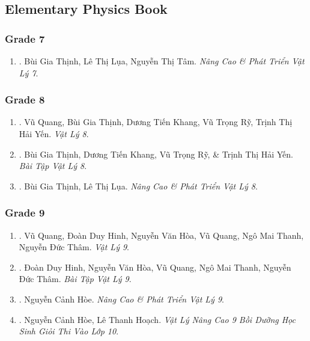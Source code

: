 \documentclass{article}
\begin{document}
\subsection{Elementary Physics Book}

\subsubsection{Grade 7}

\begin{enumerate}
	\item \cite{Thinh_Lua_ncpt_Vat_Ly_7}. Bùi Gia Thịnh, Lê Thị Lụa, Nguyễn Thị Tâm. \textit{Nâng Cao \& Phát Triển Vật Lý 7}.\hfill{\sf[reading]}
\end{enumerate}

\subsubsection{Grade 8}

\begin{enumerate}
	\item \cite{SGK_Vat_Ly_8}. Vũ Quang, Bùi Gia Thịnh, Dương Tiến Khang, Vũ Trọng Rỹ, Trịnh Thị Hải Yến. \textit{Vật Lý 8}.\hfill{\sf[reading]}
	\item \cite{SBT_Vat_Ly_8}. Bùi Gia Thịnh, Dương Tiến Khang, Vũ Trọng Rỹ, \& Trịnh Thị Hải Yến. \textit{Bài Tập Vật Lý 8}.\hfill{\sf[reading]}
	\item \cite{Thinh_Lua_ncpt_Vat_Ly_8}. Bùi Gia Thịnh, Lê Thị Lụa. \textit{Nâng Cao \& Phát Triển Vật Lý 8}.\hfill{\sf[reading]}
\end{enumerate}

\subsubsection{Grade 9}

\begin{enumerate}
	\item \cite{SGK_Vat_Ly_9}. Vũ Quang, Đoàn Duy Hinh, Nguyễn Văn Hòa, Vũ Quang, Ngô Mai Thanh, Nguyễn Đức Thâm. \textit{Vật Lý 9}.\hfill{\sf[reading]}
	\item \cite{SBT_Vat_Ly_9}. Đoàn Duy Hinh, Nguyễn Văn Hòa, Vũ Quang, Ngô Mai Thanh, Nguyễn Đức Thâm. \textit{Bài Tập Vật Lý 9}.\hfill{\sf[reading]}
	\item \cite{Hoe_Vat_Ly_9}. Nguyễn Cảnh Hòe. \textit{Nâng Cao \& Phát Triển Vật Lý 9}.\hfill{\sf[reading]}
	\item \cite{Hoe_Hoach_Vat_Ly_nang_cao_9}. Nguyễn Cảnh Hòe, Lê Thanh Hoạch. \textit{Vật Lý Nâng Cao 9 Bồi Dưỡng Học Sinh Giỏi Thi Vào Lớp 10}.\hfill{\sf[reading]}
\end{enumerate}
\end{document}
